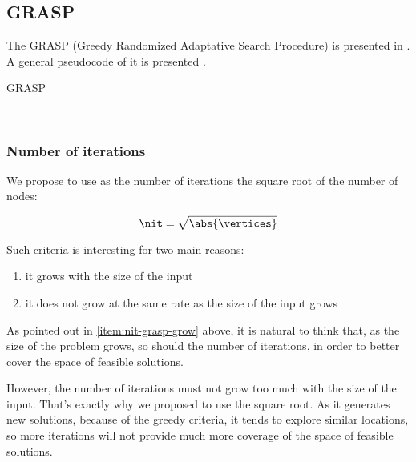 \subsection{GRASP}

The GRASP (Greedy Randomized Adaptative Search Procedure) is presented in \cite{bib:grasp}. A general pseudocode of it is presented .

\begin{algorithm}[H]
    \caption{GRASP}
    \begin{algorithmic}[1]
        \Require{$\nit, \greedyParameter$}
            \EndIf
        \EndFor
        \\
    \end{algorithmic}
    \label{algorithm:grasp}
\end{algorithm}

\subsubsection{Number of iterations}

We propose to use as the number of iterations \nit the square root of the number of nodes:

\begin{equation}
    \label{eq:number-of-iterations-grasp}
    \nit = \sqrt{\abs{\vertices}}
\end{equation}

Such criteria is interesting for two main reasons:

\begin{enumerate}
    \item it grows with the size of the input \label{item:nit-grasp-grow}
    \item it does not grow at the same rate as the size of the input grows
\end{enumerate}

As pointed out in \ref{item:nit-grasp-grow} above, it is natural to think that, as the size of the problem grows, so should the number of iterations, in order to better cover the space of feasible solutions.

However, the number of iterations must not grow too much with the size of the input. That's exactly why we proposed to use the square root. As it generates new solutions, because of the greedy criteria, it tends to explore similar locations, so more iterations will not provide much more coverage of the space of feasible solutions.

